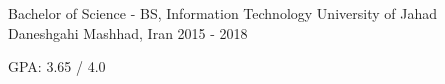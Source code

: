 


\begin{cventries}


\cventry
{Bachelor of Science - BS, Information Technology} %
{University of Jahad Daneshgahi} %
{Mashhad, Iran} %
{2015 - 2018} %
{ %
\begin{cvitems}
\item {GPA: 3.65 / 4.0}
\end{cvitems}
}


\end{cventries}